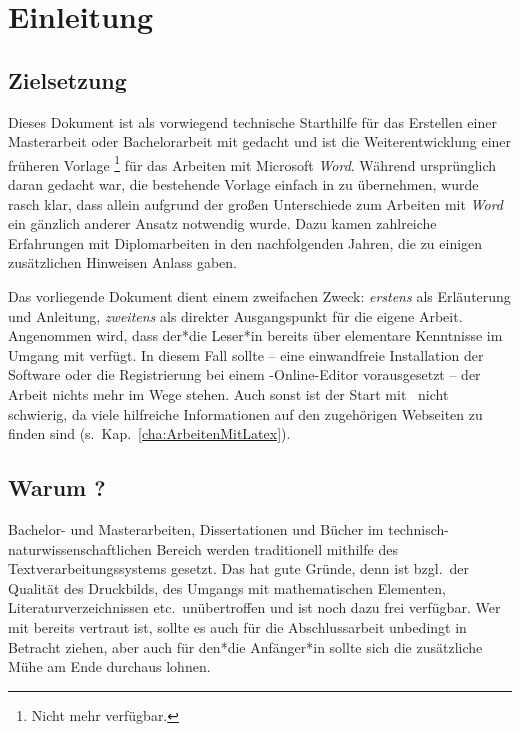 \chapter{Einleitung}
\label{cha:Einleitung}


\section{Zielsetzung}

Dieses Dokument ist als vorwiegend technische Starthilfe für das Erstellen
einer Masterarbeit oder Bachelorarbeit mit \latex gedacht und ist die
Weiterentwicklung einer früheren Vorlage%
\footnote{Nicht mehr verfügbar.}
für das Arbeiten mit Microsoft \emph{Word}. Während ursprünglich daran
gedacht war, die bestehende Vorlage einfach in \latex zu übernehmen, wurde
rasch klar, dass allein aufgrund der großen Unterschiede zum Arbeiten mit
\emph{Word} ein gänzlich anderer Ansatz notwendig wurde. Dazu kamen
zahlreiche Erfahrungen mit Diplomarbeiten in den nachfolgenden Jahren, die zu
einigen zusätzlichen Hinweisen Anlass gaben.

Das vorliegende Dokument dient einem zweifachen Zweck: \emph{erstens} als
Erläuterung und Anleitung, \emph{zweitens} als direkter Ausgangspunkt für die
eigene Arbeit. Angenommen wird, dass der*die Leser*in bereits über elementare
Kenntnisse im Umgang mit \latex verfügt. In diesem Fall sollte -- eine
einwandfreie Installation der Software oder die Registrierung bei einem
\latex-Online-Editor vorausgesetzt -- der Arbeit nichts mehr im Wege stehen.
Auch sonst ist der Start mit \latex\ nicht schwierig, da viele hilfreiche
Informationen auf den zugehörigen Webseiten zu finden sind
(s.\ Kap.~\ref{cha:ArbeitenMitLatex}).


\section{Warum {\latex}?}

Bachelor- und Masterarbeiten, Dissertationen und Bücher im technisch-%
natur\-wissen\-schaft\-lichen Bereich werden traditionell mithilfe
des Textverarbeitungssystems \latex \cite{Lamport1994, Lamport1995} gesetzt.
Das hat gute Gründe, denn \latex ist bzgl.\ der Qualität des Druckbilds, des
Umgangs mit mathematischen Elementen, Literaturverzeichnissen etc.\
unübertroffen und ist noch dazu frei verfügbar. Wer mit \latex bereits
vertraut ist, sollte es auch für die Abschlussarbeit unbedingt in Betracht
ziehen, aber auch für den*die Anfänger*in sollte sich die zusätzliche Mühe am
Ende durchaus lohnen.

